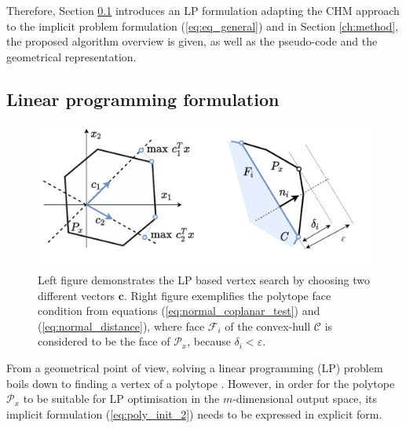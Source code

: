 Therefore, Section \ref{ch:lp_adapt} introduces an LP formulation adapting the CHM approach to the implicit problem formulation (\ref{eq:eq_general}) and in Section \ref{ch:method}, the proposed algorithm overview is given, as well as the pseudo-code and the geometrical representation.






\subsection{Linear programming formulation}
\label{ch:lp_adapt}


\begin{figure}[!t]
    \centering
    \includegraphics[width=0.70\linewidth]{Papers/images/poly_lp_vert_sample.pdf}
    \vspace{-0.2cm}
    \caption{Left figure demonstrates the LP based vertex search by choosing two different vectors $\bm{c}$. Right figure exemplifies the polytope face condition from equations (\ref{eq:normal_coplanar_test}) and (\ref{eq:normal_distance}), where  face $\mathcal{F}_i$ of the convex-hull $\mathcal{C}$ is considered to be the face of $\mathcal{P}_x$, because $\delta_i\! < \!\varepsilon$.  }
    \label{fig:sample_problems}
\end{figure}

From a geometrical point of view, solving a linear programming (LP) problem boils down to finding a vertex of a polytope \cite{vajda_gass_1964}. However, in order for the polytope $\mathcal{P}_x$ to be suitable for LP optimisation in the $m$-dimensional output space, its implicit formulation (\ref{eq:poly_init_2}) needs to be expressed in explicit form.

